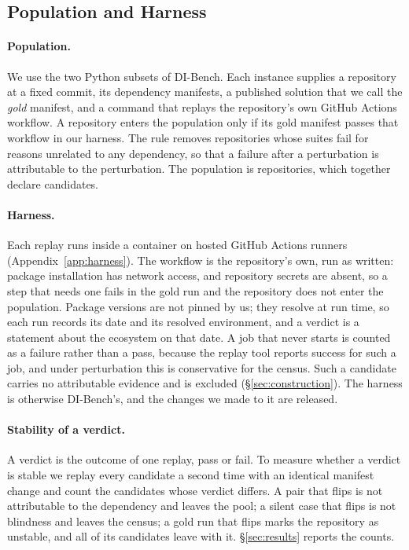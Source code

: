 \documentclass[11pt]{article}
\newcommand{\dibench}{DI-Bench}
\begin{document}
\subsection{Population and Harness}
\label{sec:setup}

\paragraph{Population.}
We use the two Python subsets of \dibench{}.
Each instance supplies a repository at a fixed commit, its dependency manifests, a published solution that we call the \emph{gold} manifest, and a command that replays the repository's own GitHub Actions workflow.
A repository enters the population only if its gold manifest passes that workflow in our harness.
The rule removes repositories whose suites fail for reasons unrelated to any dependency, so that a failure after a perturbation is attributable to the perturbation.
The population is \nRepos{} repositories, which together declare \nCand{} candidates.

\paragraph{Harness.}
Each replay runs inside a container on hosted GitHub Actions runners (Appendix~\ref{app:harness}).
The workflow is the repository's own, run as written: package installation has network access, and repository secrets are absent, so a step that needs one fails in the gold run and the repository does not enter the population.
Package versions are not pinned by us; they resolve at run time, so each run records its date and its resolved environment, and a verdict is a statement about the ecosystem on that date.
A job that never starts is counted as a failure rather than a pass, because the replay tool reports success for such a job, and under perturbation this is conservative for the census.
Such a candidate carries no attributable evidence and is excluded (\S\ref{sec:construction}).
The harness is otherwise \dibench's, and the changes we made to it are released.

\paragraph{Stability of a verdict.}
A verdict is the outcome of one replay, pass or fail.
To measure whether a verdict is stable we replay every candidate a second time with an identical manifest change and count the candidates whose verdict differs.
A pair that flips is not attributable to the dependency and leaves the pool; a silent case that flips is not blindness and leaves the census; a gold run that flips marks the repository as unstable, and all of its candidates leave with it.
\S\ref{sec:results} reports the counts.
\end{document}
